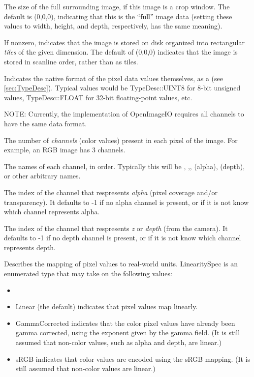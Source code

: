The size of the full surrounding image, if this image is a crop window.
The default is (0,0,0), indicating that this is the ``full'' image data
(setting these values to {\cf width}, {\cf height}, and {\cf depth},
respectively, has the same meaning).
\apiend

If nonzero, indicates that the image is stored on disk organized into
rectangular \emph{tiles} of the given dimension.  The default of 
(0,0,0) indicates that the image is stored in scanline order, rather
than as tiles.
\apiend

Indicates the native format of the pixel data values themselves, as a 
\TypeDesc (see \ref{sec:TypeDesc}).  Typical values would be
{\cf TypeDesc::UINT8} for 8-bit unsigned values, {\cf TypeDesc::FLOAT} for 32-bit
floating-point values, etc.

\noindent NOTE: Currently, the implementation of OpenImageIO requires
all channels to have the same data format.
\apiend

The number of \emph{channels} (color values) present in each pixel of
the image.  For example, an RGB image has 3 channels.
\apiend

The names of each channel, in order.  Typically this will be ,
,,  (alpha),  (depth), or other arbitrary
names.
\apiend

The index of the channel that respresents \emph{alpha} (pixel coverage
and/or transparency).  It defaults to -1 if no alpha channel is present,
or if it is not know which channel represents alpha.
\apiend

The index of the channel that respresents \emph{z} or \emph{depth} (from
the camera).  It defaults to -1 if no depth channel is present, or if it
is not know which channel represents depth.
\apiend

Describes the mapping of pixel values to real-world units.  
{\cf LinearitySpec} is
an enumerated type that may take on the following values:
\begin{itemize}
\item[] 
\item {\cf Linear} (the default) indicates that pixel values map
  linearly.
\item {\cf GammaCorrected} indicates that the color pixel values have
  already been gamma corrected, using the exponent given by the {\cf
    gamma} field.  (It is still assumed that non-color values, such as
  alpha and depth, are linear.)
\item {\cf sRGB} indicates that color values are encoded using the sRGB
  mapping.  (It is still assumed that non-color values are linear.)
\end{itemize}
\apiend

